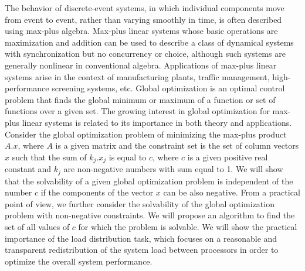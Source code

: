 
\begin{Abstrakt}
    The behavior of discrete-event systems, in which individual components move from event to event, rather than varying smoothly in time, is often described using max-plus algebra. Max-plus linear systems whose basic operations are maximization and addition can be used to describe a class of dynamical systems with synchronization but no concurrency or choice, although such systems are generally nonlinear in conventional algebra. Applications of max-plus linear systems arise in the context of manufacturing plants, traffic management, high-performance screening systems, etc. Global optimization is an optimal control problem that finds the global minimum or maximum of a function or set of functions over a given set. The growing interest in global optimization for max-plus linear systems is related to its importance in both theory and applications. Consider the global optimization problem of minimizing the max-plus product $A.x$, where $A$ is a given matrix and the constraint set is the set of column vectors $x$ such that the sum of $k_j.x_j$ is equal to $c$, where $c$ is a given positive real constant and $k_j$ are non-negative numbers with sum equal to 1. We will show that the solvability of a given global optimization problem is independent of the number $c$ if the components of the vector $x$ can be also negative. From a practical point of view, we further consider the solvability of the global optimization problem with non-negative constraints. We will propose an algorithm to find the set of all values of $c$ for which the problem is solvable. We will show the practical importance of the load distribution task, which focuses on a reasonable and transparent redistribution of the system load between processors in order to optimize the overall system performance.
\end{Abstrakt}



\clearpage